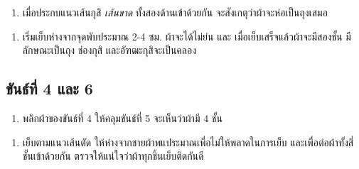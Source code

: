 

\begin{enumerate}
\def\labelenumi{(\arabic{enumi})}
\setcounter{enumi}{4}
\tightlist
\item
  เมื่อประกบแนวเส้นกุสิ \emph{เส้นขาด} ทั้งสองด้านเข้าด้วยกัน
  จะสังเกตุว่าผ้าจะห่อเป็นถุงเสมอ
\end{enumerate}



\begin{enumerate}
\def\labelenumi{(\arabic{enumi})}
\setcounter{enumi}{5}
\tightlist
\item
  เริ่มเย็บห่างจากจุดพับประมาณ 2-4 ซม. ผ้าจะได้ไม่ย่น และ เมื่อเย็บเสร็จแล้วผ้าจะมีสองชั้น
  มีลักษณะเป็นถุง ช่องกุสิ และอัฑฒะกุสิจะเป็นคลอง
\end{enumerate}



\clearpage

\subsection{ขันธ์ที่ 4 และ 6}

\begin{enumerate}
\def\labelenumi{(\arabic{enumi})}
\tightlist
\item
  พลิกผ้าของขันธ์ที่ 4 ให้คลุมขันธ์ที่ 5 จะเห็นว่าผ้ามี 4 ชั้น
\end{enumerate}

\setlength{\nextPhotoWidth}{0.6\textwidth}



\begin{enumerate}
\def\labelenumi{(\arabic{enumi})}
\setcounter{enumi}{1}
\tightlist
\item
  เย็บตามแนวเส้นตัด ให้ห่างจากชายผ้าพแประมาณเพื่อไม่ให้พลาดในการเย็บ
  และเพื่อต่อผ้าทั้งสี่ชั้นเข้าด้วยกัน ตรวจให้แน่ใจว่าผ้าทุกชิ้นเย็บติดกันดี
\end{enumerate}

